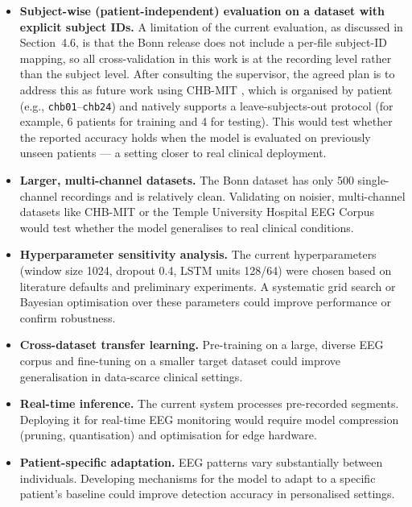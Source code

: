 \begin{itemize}
    \item \textbf{Subject-wise (patient-independent) evaluation on a dataset with explicit subject IDs.} A limitation of the current evaluation, as discussed in Section~4.6, is that the Bonn release does not include a per-file subject-ID mapping, so all cross-validation in this work is at the recording level rather than the subject level. After consulting the supervisor, the agreed plan is to address this as future work using CHB-MIT \cite{shoeb2010}, which is organised by patient (e.g., \texttt{chb01}--\texttt{chb24}) and natively supports a leave-subjects-out protocol (for example, 6 patients for training and 4 for testing). This would test whether the reported accuracy holds when the model is evaluated on previously unseen patients --- a setting closer to real clinical deployment.

    \item \textbf{Larger, multi-channel datasets.} The Bonn dataset has only 500 single-channel recordings and is relatively clean. Validating on noisier, multi-channel datasets like CHB-MIT \cite{shoeb2010} or the Temple University Hospital EEG Corpus \cite{obeid2016} would test whether the model generalises to real clinical conditions.

    \item \textbf{Hyperparameter sensitivity analysis.} The current hyperparameters (window size 1024, dropout 0.4, LSTM units 128/64) were chosen based on literature defaults and preliminary experiments. A systematic grid search or Bayesian optimisation over these parameters could improve performance or confirm robustness.

    \item \textbf{Cross-dataset transfer learning.} Pre-training on a large, diverse EEG corpus and fine-tuning on a smaller target dataset could improve generalisation in data-scarce clinical settings.

    \item \textbf{Real-time inference.} The current system processes pre-recorded segments. Deploying it for real-time EEG monitoring would require model compression (pruning, quantisation) and optimisation for edge hardware.

    \item \textbf{Patient-specific adaptation.} EEG patterns vary substantially between individuals. Developing mechanisms for the model to adapt to a specific patient's baseline could improve detection accuracy in personalised settings.
\end{itemize}
